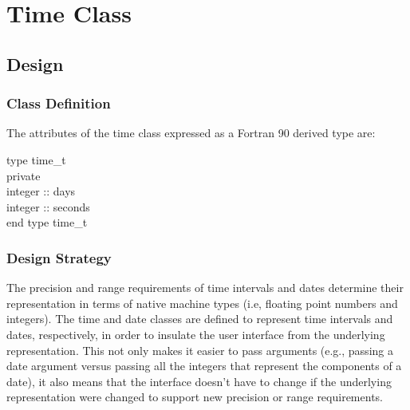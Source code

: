 \documentclass[]{article}
\begin{document}
%

%

%

\section{Time Class}



\subsection{Design}

\subsubsection{Class Definition}

The attributes of the time class expressed as a Fortran 90 derived type are:

\noindent type time\_t \\
\indent private \\
\indent integer :: days \\
\indent integer :: seconds \\
\noindent end type time\_t

\subsubsection{Design Strategy}

The precision and range requirements of time intervals and dates determine their representation in 
terms of native machine types (i.e, floating point numbers and integers). The time and date classes
are defined to represent time intervals and dates, respectively, in order to insulate the user interface 
from the underlying representation.  This not only makes it easier to pass arguments (e.g., passing a
date argument versus passing all the integers that represent the components of a date), it also means 
that the interface doesn't have to change if the underlying representation were changed to support 
new precision or range requirements.
\end{document}
